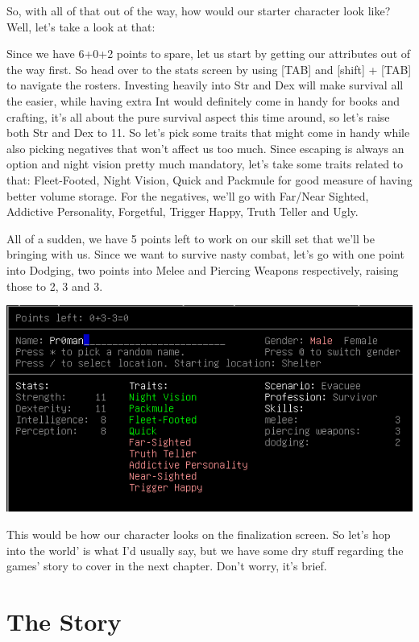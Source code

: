 \documentclass[11pt]{report}
\begin{document}
So, with all of that out of the way, how would our starter character look like? Well, let's take a look at that:

Since we have 6+0+2 points to spare, let us start by getting our attributes out of the way first. So head over to the stats screen by using [TAB] and [shift] + [TAB] to navigate the rosters. Investing heavily into Str and Dex will make survival all the easier, while having extra Int would definitely come in handy for books and crafting, it's all about the pure survival aspect this time around, so let's raise both Str and Dex to 11. So let's pick some traits that might come in handy while also picking negatives that won't affect us too much. Since escaping is always an option and night vision pretty much mandatory, let's take some traits related to that: Fleet-Footed, Night Vision, Quick and Packmule for good measure of having better volume storage. For the negatives, we'll go with Far/Near Sighted, Addictive Personality, Forgetful, Trigger Happy, Truth Teller and Ugly.

All of a sudden, we have 5 points left to work on our skill set that we'll be bringing with us. Since we want to survive nasty combat, let's go with one point into Dodging, two points into Melee and Piercing Weapons respectively, raising those to 2, 3 and 3.

\includegraphics{02}

This would be how our character looks on the finalization screen. So let's hop into the world' is what I'd usually say, but we have some dry stuff regarding the games' story to cover in the next chapter. Don't worry, it's brief.

\chapter{The Story}
\end{document}
